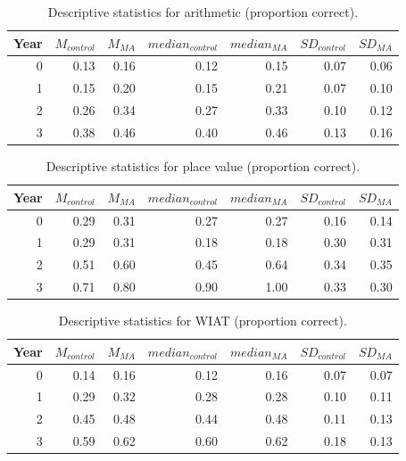 \documentclass[11pt]{article}
\begin{document}
\begin{table}[H]
\centering
\begin{tabular}{rrrrrrr}
  \hline
Year & $M_{control}$ & $M_{MA}$ & $median_{control}$ & $median_{MA}$ & $SD_{control}$ & $SD_{MA}$ \\ 
  \hline
  0 & 0.13 & 0.16 & 0.12 & 0.15 & 0.07 & 0.06 \\ 
    1 & 0.15 & 0.20 & 0.15 & 0.21 & 0.07 & 0.10 \\ 
    2 & 0.26 & 0.34 & 0.27 & 0.33 & 0.10 & 0.12 \\ 
    3 & 0.38 & 0.46 & 0.40 & 0.46 & 0.13 & 0.16 \\ 
   \hline
\end{tabular}
\caption{Descriptive statistics for arithmetic (proportion correct).} 
\label{tab:arith}
\end{table}
\begin{table}[H]
\centering
\begin{tabular}{rrrrrrr}
  \hline
Year & $M_{control}$ & $M_{MA}$ & $median_{control}$ & $median_{MA}$ & $SD_{control}$ & $SD_{MA}$ \\ 
  \hline
  0 & 0.29 & 0.31 & 0.27 & 0.27 & 0.16 & 0.14 \\ 
    1 & 0.29 & 0.31 & 0.18 & 0.18 & 0.30 & 0.31 \\ 
    2 & 0.51 & 0.60 & 0.45 & 0.64 & 0.34 & 0.35 \\ 
    3 & 0.71 & 0.80 & 0.90 & 1.00 & 0.33 & 0.30 \\ 
   \hline
\end{tabular}
\caption{Descriptive statistics for place value (proportion correct).} 
\label{tab:placeval}
\end{table}

\begin{table}[ht]
\centering
\begin{tabular}{rrrrrrr}
  \hline
Year & $M_{control}$ & $M_{MA}$ & $median_{control}$ & $median_{MA}$ & $SD_{control}$ & $SD_{MA}$ \\ 
  \hline
  0 & 0.14 & 0.16 & 0.12 & 0.16 & 0.07 & 0.07 \\ 
    1 & 0.29 & 0.32 & 0.28 & 0.28 & 0.10 & 0.11 \\ 
    2 & 0.45 & 0.48 & 0.44 & 0.48 & 0.11 & 0.13 \\ 
    3 & 0.59 & 0.62 & 0.60 & 0.62 & 0.18 & 0.13 \\ 
   \hline
\end{tabular}
\caption{Descriptive statistics for WIAT (proportion correct).} 
\label{tab:wiat}
\end{table}
\end{document}
